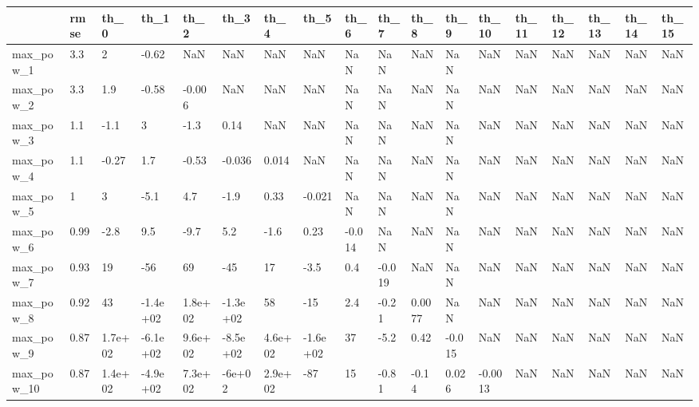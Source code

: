 \begin{tabular}{llllllllllllllllll}
\toprule
{} & rmse &     th\_0 &     th\_1 &     th\_2 &     th\_3 &     th\_4 &     th\_5 &     th\_6 &     th\_7 &     th\_8 &     th\_9 &    th\_10 &    th\_11 &    th\_12 &   th\_13 & th\_14 & th\_15 \\
\midrule
max\_pow\_1  &  3.3 &        2 &    -0.62 &      NaN &      NaN &      NaN &      NaN &      NaN &      NaN &      NaN &      NaN &      NaN &      NaN &      NaN &     NaN &   NaN &   NaN \\
max\_pow\_2  &  3.3 &      1.9 &    -0.58 &   -0.006 &      NaN &      NaN &      NaN &      NaN &      NaN &      NaN &      NaN &      NaN &      NaN &      NaN &     NaN &   NaN &   NaN \\
max\_pow\_3  &  1.1 &     -1.1 &        3 &     -1.3 &     0.14 &      NaN &      NaN &      NaN &      NaN &      NaN &      NaN &      NaN &      NaN &      NaN &     NaN &   NaN &   NaN \\
max\_pow\_4  &  1.1 &    -0.27 &      1.7 &    -0.53 &   -0.036 &    0.014 &      NaN &      NaN &      NaN &      NaN &      NaN &      NaN &      NaN &      NaN &     NaN &   NaN &   NaN \\
max\_pow\_5  &    1 &        3 &     -5.1 &      4.7 &     -1.9 &     0.33 &   -0.021 &      NaN &      NaN &      NaN &      NaN &      NaN &      NaN &      NaN &     NaN &   NaN &   NaN \\
max\_pow\_6  & 0.99 &     -2.8 &      9.5 &     -9.7 &      5.2 &     -1.6 &     0.23 &   -0.014 &      NaN &      NaN &      NaN &      NaN &      NaN &      NaN &     NaN &   NaN &   NaN \\
max\_pow\_7  & 0.93 &       19 &      -56 &       69 &      -45 &       17 &     -3.5 &      0.4 &   -0.019 &      NaN &      NaN &      NaN &      NaN &      NaN &     NaN &   NaN &   NaN \\
max\_pow\_8  & 0.92 &       43 & -1.4e+02 &  1.8e+02 & -1.3e+02 &       58 &      -15 &      2.4 &    -0.21 &   0.0077 &      NaN &      NaN &      NaN &      NaN &     NaN &   NaN &   NaN \\
max\_pow\_9  & 0.87 &  1.7e+02 & -6.1e+02 &  9.6e+02 & -8.5e+02 &  4.6e+02 & -1.6e+02 &       37 &     -5.2 &     0.42 &   -0.015 &      NaN &      NaN &      NaN &     NaN &   NaN &   NaN \\
max\_pow\_10 & 0.87 &  1.4e+02 & -4.9e+02 &  7.3e+02 &   -6e+02 &  2.9e+02 &      -87 &       15 &    -0.81 &    -0.14 &    0.026 &  -0.0013 &      NaN &      NaN &     NaN &   NaN &   NaN \\

\end{tabular}
